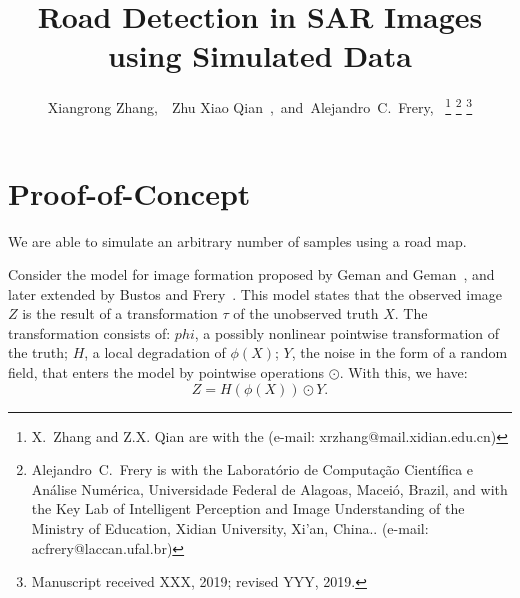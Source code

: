 \documentclass[journal]{IEEEtran}
\begin{document}
	
\title{Road Detection in SAR Images using Simulated Data}
	
\author{Xiangrong Zhang,~~Zhu Xiao Qian~,~and~Alejandro~C.~Frery,~%
	\thanks{X.~Zhang and Z.X. Qian are with the  (e-mail: xrzhang@mail.xidian.edu.cn)}%
	\thanks{Alejandro~C.~Frery is with the Laborat\'orio de Computa\c c\~ao Cient\'ifica e An\'alise Num\'erica, Universidade Federal de Alagoas, Macei\'o, Brazil, and with the Key Lab of Intelligent Perception and Image Understanding of the Ministry of Education, Xidian University, Xi'an, China.. (e-mail: acfrery@laccan.ufal.br)}%
	\thanks{Manuscript received XXX, 2019; revised YYY, 2019.}
	}


\maketitle

\IEEEdisplaynontitleabstractindextext
\IEEEpeerreviewmaketitle

\section{Proof-of-Concept}\label{sec:SamplingMethodology}

We are able to simulate an arbitrary number of samples using a road map.

Consider the model for image formation proposed by Geman and Geman~\cite{geman84}, and later extended by Bustos and Frery~\cite{buseucam92}.
This model states that the observed image $Z$ is the result of a transformation $\tau$ of the unobserved truth $X$.
The transformation consists of:
$phi$, a possibly nonlinear pointwise transformation of the truth;
$H$, a local degradation of $\phi(X)$;
$Y$, the noise in the form of a random field, that enters the model by pointwise operations $\odot$.
With this, we have:
\begin{equation}
Z = H(\phi(X)) \odot Y.
\end{equation}
\end{document}
